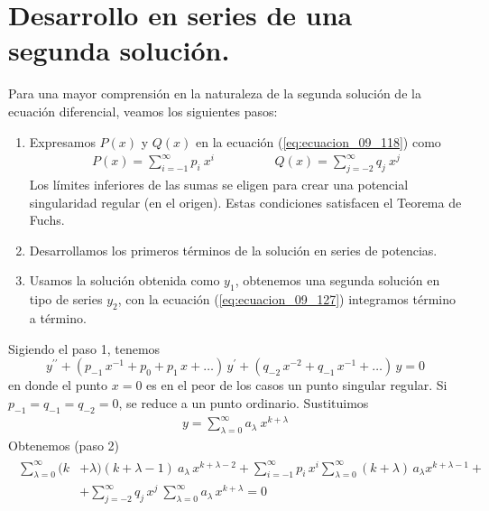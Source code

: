 \section{Desarrollo en series de una segunda solución.}
Para una mayor comprensión en la naturaleza de la segunda solución de la ecuación diferencial, veamos los siguientes pasos:
\begin{enumerate}
\item Expresamos $P(x)$ y $Q(x)$ en la ecuación (\ref{eq:ecuacion_09_118}) como
\begin{align}
P(x) = \sum_{i=-1}^{\infty} p_{i} \: x^{i} \hspace{2cm} Q(x) = \sum_{j=-2}^{\infty} q_{j} \: x^{j}
\label{eq:ecuacion_09_129}
\end{align}
Los límites inferiores de las sumas se eligen para crear una potencial singularidad regular (en el origen). Estas condiciones satisfacen el Teorema de Fuchs.
\item Desarrollamos los primeros términos de la solución en series de potencias.
\item Usamos la solución obtenida como $y_{1}$, obtenemos una segunda solución en tipo de series $y_{2}$, con la ecuación (\ref{eq:ecuacion_09_127}) integramos término a término.
\end{enumerate}
Sigiendo el paso 1, tenemos
\begin{equation}
y^{\prime \prime} + (p_{-1} \, x^{-1} + p_{0} + p_{1} \, x + \ldots) \, y^{\prime} + (q_{-2} \, x^{-2} + q_{-1} \, x^{-1} + \ldots) \, y = 0
\label{eq:ecuacion_09_130}
\end{equation}
en donde el punto $x = 0$ es en el peor de los casos un punto singular regular. Si $p_{-1} = q_{-1} = q_{-2} = 0$, se reduce a un punto ordinario. Sustituimos
\begin{align*}
y = \sum_{\lambda = 0}^{\infty} a_{\lambda} \: x^{k + \lambda}
\end{align*}
Obtenemos (paso 2)
\begin{align}
\begin{aligned}
\sum_{\lambda=0}^{\infty} (k &+ \lambda)(k + \lambda - 1) \: a_{\lambda} \, x^{k + \lambda - 2} + \sum_{i=-1}^{\infty} p_{i} \, x^{i} \sum_{\lambda=0}^{\infty} (k + \lambda) \,  a_{\lambda} x^{k + \lambda - 1} + \\
&+ \sum_{j=-2}^{\infty} q_{j} \, x^{j} \: \sum_{\lambda=0}^{\infty} a_{\lambda} \, x^{k + \lambda} = 0
\end{aligned}
\label{eq:ecuacion_09_131}
\end{align}
